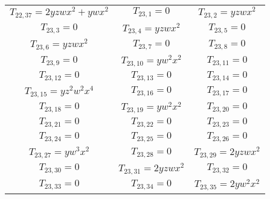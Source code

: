 \documentclass[12pt]{memoireuqam1.3}
\begin{document}
\begin{longtable}{|c|c|c|}
$T_{22,37}= 2yzwx^2+ywx^2$&

$T_{23,1}= 0$&

$T_{23,2}= yzwx^2$\\

$T_{23,3}= 0$&

$T_{23,4}= yzwx^2$&

$T_{23,5}= 0$\\

$T_{23,6}= yzwx^2$&

$T_{23,7}= 0$&

$T_{23,8}= 0$\\

$T_{23,9}= 0$&

$T_{23,10}= yw^2x^2$&

$T_{23,11}= 0$\\

$T_{23,12}= 0$&

$T_{23,13}= 0$&

$T_{23,14}= 0$\\

$T_{23,15}= yz^2w^2x^4$&

$T_{23,16}= 0$&

$T_{23,17}= 0$\\

$T_{23,18}= 0$&

$T_{23,19}= yw^2x^2$&

$T_{23,20}= 0$\\

$T_{23,21}= 0$&

$T_{23,22}= 0$&

$T_{23,23}= 0$\\

$T_{23,24}= 0$&

$T_{23,25}= 0$&

$T_{23,26}= 0$\\

$T_{23,27}= yw^3x^2$&

$T_{23,28}= 0$&

$T_{23,29}= 2yzwx^2$\\

$T_{23,30}= 0$&

$T_{23,31}= 2yzwx^2$&

$T_{23,32}= 0$\\

$T_{23,33}= 0$&

$T_{23,34}= 0$&

$T_{23,35}= 2yw^2x^2$\\


\end{longtable}
\end{document}
